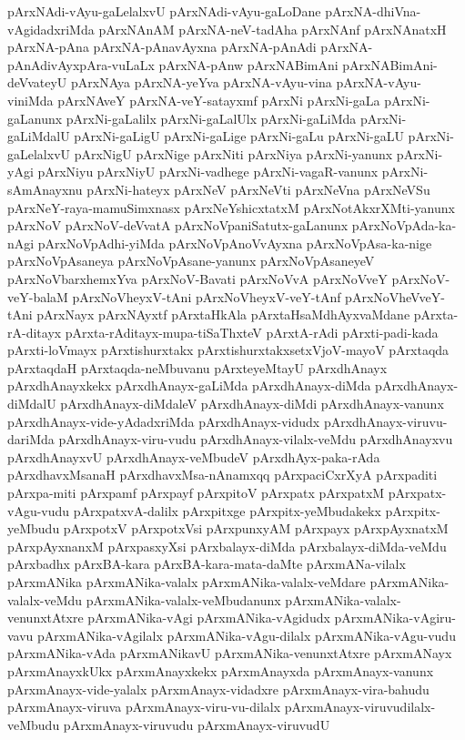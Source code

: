 {pArxNAdi-vAyu-gaLelalxvU
pArxNAdi-vAyu-gaLoDane
pArxNA-dhiVna-vAgidadxriMda
pArxNAnAM
pArxNA-neV-tadAha
pArxNAnf
pArxNAnatxH
pArxNA-pAna
pArxNA-pAnavAyxna
pArxNA-pAnAdi
pArxNA-pAnAdivAyxpAra-vuLaLx
pArxNA-pAnw
pArxNABimAni
pArxNABimAni-deVvateyU
pArxNAya
pArxNA-yeYva
pArxNA-vAyu-vina
pArxNA-vAyu-viniMda
pArxNAveY
pArxNA-veY-satayxmf
pArxNi
pArxNi-gaLa
pArxNi-gaLanunx
pArxNi-gaLalilx
pArxNi-gaLalUlx
pArxNi-gaLiMda
pArxNi-gaLiMdalU
pArxNi-gaLigU
pArxNi-gaLige
pArxNi-gaLu
pArxNi-gaLU
pArxNi-gaLelalxvU
pArxNigU
pArxNige
pArxNiti
pArxNiya
pArxNi-yanunx
pArxNi-yAgi
pArxNiyu
pArxNiyU
pArxNi-vadhege
pArxNi-vagaR-vanunx
pArxNi-sAmAnayxnu
pArxNi-hateyx
pArxNeV
pArxNeVti
pArxNeVna
pArxNeVSu
pArxNeY-raya-mamuSimxnasx
pArxNeYshicxtatxM
pArxNotAkxrXMti-yanunx
pArxNoV
pArxNoV-deVvatA
pArxNoVpaniSatutx-gaLanunx
pArxNoVpAda-ka-nAgi
pArxNoVpAdhi-yiMda
pArxNoVpAnoVvAyxna
pArxNoVpAsa-ka-nige
pArxNoVpAsaneya
pArxNoVpAsane-yanunx
pArxNoVpAsaneyeV
pArxNoVbarxhemxYva
pArxNoV-Bavati
pArxNoVvA
pArxNoVveY
pArxNoV-veY-balaM
pArxNoVheyxV-tAni
pArxNoVheyxV-veY-tAnf
pArxNoVheVveY-tAni
pArxNayx
pArxNAyxtf
pArxtaHkAla
pArxtaHsaMdhAyxvaMdane
pArxta-rA-ditayx
pArxta-rAditayx-mupa-tiSaThxteV
pArxtA-rAdi
pArxti-padi-kada
pArxti-loVmayx
pArxtishurxtakx
pArxtishurxtakxsetxVjoV-mayoV
pArxtaqda
pArxtaqdaH
pArxtaqda-neMbuvanu
pArxteyeMtayU
pArxdhAnayx
pArxdhAnayxkekx
pArxdhAnayx-gaLiMda
pArxdhAnayx-diMda
pArxdhAnayx-diMdalU
pArxdhAnayx-diMdaleV
pArxdhAnayx-diMdi
pArxdhAnayx-vanunx
pArxdhAnayx-vide-yAdadxriMda
pArxdhAnayx-vidudx
pArxdhAnayx-viruvu-dariMda
pArxdhAnayx-viru-vudu
pArxdhAnayx-vilalx-veMdu
pArxdhAnayxvu
pArxdhAnayxvU
pArxdhAnayx-veMbudeV
pArxdhAyx-paka-rAda
pArxdhavxMsanaH
pArxdhavxMsa-nAnamxqq
pArxpaciCxrXyA
pArxpaditi
pArxpa-miti
pArxpamf
pArxpayf
pArxpitoV
pArxpatx
pArxpatxM
pArxpatx-vAgu-vudu
pArxpatxvA-dalilx
pArxpitxge
pArxpitx-yeMbudakekx
pArxpitx-yeMbudu
pArxpotxV
pArxpotxVsi
pArxpunxyAM
pArxpayx
pArxpAyxnatxM
pArxpAyxnanxM
pArxpasxyXsi
pArxbalayx-diMda
pArxbalayx-diMda-veMdu
pArxbadhx
pArxBA-kara
pArxBA-kara-mata-daMte
pArxmANa-vilalx
pArxmANika
pArxmANika-valalx
pArxmANika-valalx-veMdare
pArxmANika-valalx-veMdu
pArxmANika-valalx-veMbudanunx
pArxmANika-valalx-venunxtAtxre
pArxmANika-vAgi
pArxmANika-vAgidudx
pArxmANika-vAgiru-vavu
pArxmANika-vAgilalx
pArxmANika-vAgu-dilalx
pArxmANika-vAgu-vudu
pArxmANika-vAda
pArxmANikavU
pArxmANika-venunxtAtxre
pArxmANayx
pArxmAnayxkUkx
pArxmAnayxkekx
pArxmAnayxda
pArxmAnayx-vanunx
pArxmAnayx-vide-yalalx
pArxmAnayx-vidadxre
pArxmAnayx-vira-bahudu
pArxmAnayx-viruva
pArxmAnayx-viru-vu-dilalx
pArxmAnayx-viruvudilalx-veMbudu
pArxmAnayx-viruvudu
pArxmAnayx-viruvudU
}
